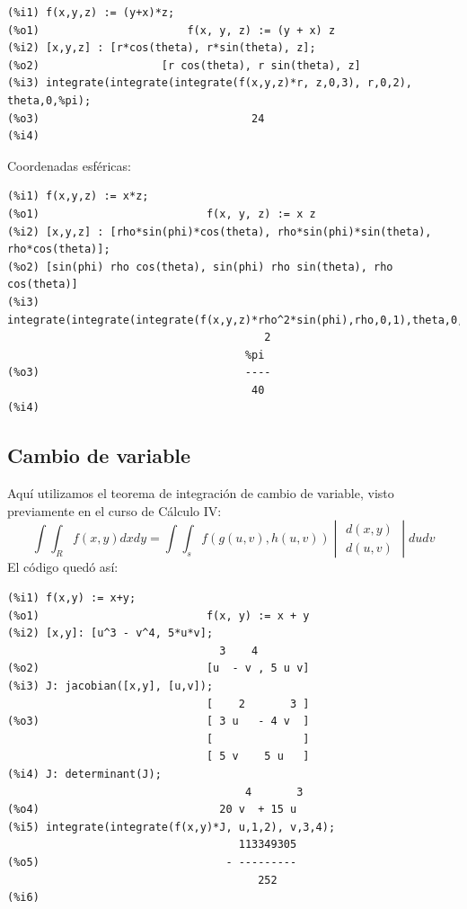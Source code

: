 \documentclass[12pt,letterpaper]{article}
\begin{document}
\begin{verbatim}
(%i1) f(x,y,z) := (y+x)*z;
(%o1)                       f(x, y, z) := (y + x) z
(%i2) [x,y,z] : [r*cos(theta), r*sin(theta), z];
(%o2)                   [r cos(theta), r sin(theta), z]
(%i3) integrate(integrate(integrate(f(x,y,z)*r, z,0,3), r,0,2), theta,0,%pi);
(%o3)                                 24
(%i4) 
\end{verbatim}

Coordenadas esféricas:

\begin{verbatim}
(%i1) f(x,y,z) := x*z;
(%o1)                          f(x, y, z) := x z
(%i2) [x,y,z] : [rho*sin(phi)*cos(theta), rho*sin(phi)*sin(theta), rho*cos(theta)];
(%o2) [sin(phi) rho cos(theta), sin(phi) rho sin(theta), rho cos(theta)]
(%i3) integrate(integrate(integrate(f(x,y,z)*rho^2*sin(phi),rho,0,1),theta,0,%pi),phi,0,%pi/2);
                                        2
                                     %pi
(%o3)                                ----
                                      40
(%i4) 
\end{verbatim}


\subsection{Cambio de variable}

Aquí utilizamos el teorema de integración de cambio de variable, visto previamente en el curso de Cálculo IV: 
$$ \int\int_R f(x, y)dxdy = \int\int_s f(g(u, v), h(u, v)) \begin{vmatrix}
d(x, y) \\ d(u, v)
\end{vmatrix}dudv $$
El código quedó así:

\begin{verbatim}
(%i1) f(x,y) := x+y;
(%o1)                          f(x, y) := x + y
(%i2) [x,y]: [u^3 - v^4, 5*u*v];
                                 3    4
(%o2)                          [u  - v , 5 u v]
(%i3) J: jacobian([x,y], [u,v]);
                               [    2       3 ]
(%o3)                          [ 3 u   - 4 v  ]
                               [              ]
                               [ 5 v    5 u   ]
(%i4) J: determinant(J);
                                     4       3
(%o4)                            20 v  + 15 u
(%i5) integrate(integrate(f(x,y)*J, u,1,2), v,3,4);
                                    113349305
(%o5)                             - ---------
                                       252
(%i6) 
\end{verbatim}
\end{document}

